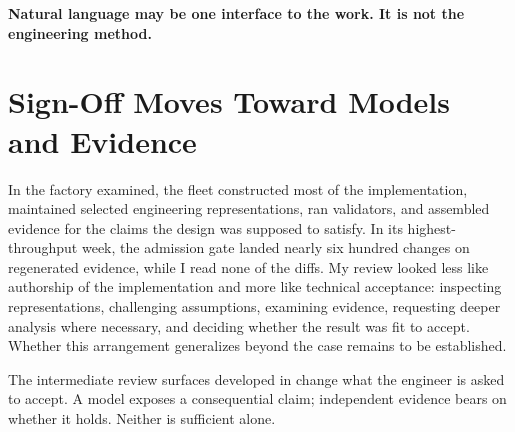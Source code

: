 
\textbf{Natural language may be one interface to the work. It is not the engineering method.}

\section{Sign-Off Moves Toward Models and Evidence}\label{heading:sign-off-moves-toward-models-and-evidence}



In the factory  examined, the fleet constructed most of the implementation, maintained selected engineering representations, ran validators, and assembled evidence for the claims the design was supposed to satisfy. In its highest-throughput week, the admission gate landed nearly six hundred changes on regenerated evidence, while I read none of the diffs. My review looked less like authorship of the implementation and more like technical acceptance: inspecting representations, challenging assumptions, examining evidence, requesting deeper analysis where necessary, and deciding whether the result was fit to accept. Whether this arrangement generalizes beyond the case remains to be established.


The intermediate review surfaces developed in  change what the engineer is asked to accept. A model exposes a consequential claim; independent evidence bears on whether it holds. Neither is sufficient alone.


